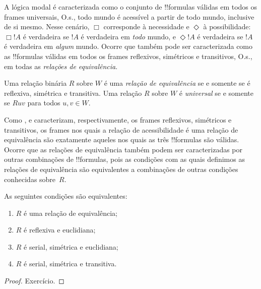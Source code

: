 \documentclass[../../../include/open-logic-section]{subfiles}
\begin{document}


A lógica modal  é caracterizada como o conjunto de !!{formula}s
válidas em todos os frames universais, O.s.\@, todo mundo é acessível a partir
de todo mundo, inclusive de si mesmo. Nesse cenário, $\Box$ corresponde à
necessidade e $\Diamond$ à possibilidade: $\Box !A$ é verdadeira se $!A$ é
verdadeira em \emph{todo} mundo, e $\Diamond !A$ é verdadeira se $!A$ é
verdadeira em \emph{algum} mundo. Ocorre que  também pode ser
caracterizada como as !!{formula}s válidas em todos os frames reflexivos,
simétricos e transitivos, O.s.\@, em todas as \emph{relações de equivalência}.

\begin{defn}
  Uma relação binária $R$ sobre $W$ é uma \emph{relação de equivalência} se e
  somente se é reflexiva, simétrica e transitiva. Uma relação $R$ sobre $W$ é
  \emph{universal} se e somente se $Ruv$ para todos $u,v \in W$.
\end{defn}

Como ,  e  caracterizam, respectivamente, os frames
reflexivos, simétricos e transitivos, os frames nos quais a relação de
acessibilidade é uma relação de equivalência são exatamente aqueles nos quais
as três !!{formula}s são válidas. Ocorre que as relações de equivalência
também podem ser caracterizadas por outras combinações de !!{formula}s, pois
as condições com as quais definimos as relações de equivalência são
equivalentes a combinações de outras condições conhecidas sobre~$R$.

\begin{prop}
  As seguintes condições são equivalentes:
  \begin{enumerate}
  \item $R$ é uma relação de equivalência;
  \item $R$ é reflexiva e euclidiana;
  \item $R$ é serial, simétrica e euclidiana;
  \item $R$ é serial, simétrica e transitiva.
  \end{enumerate}
\end{prop}

\begin{proof}
  Exercício.
\end{proof}
\end{document}
